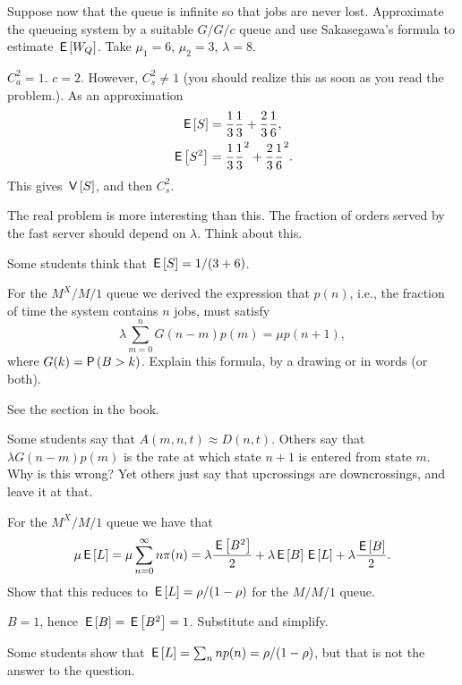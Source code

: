\begin{exercise}[201904, 2]
  Suppose now that the queue is infinite so that jobs are never lost.
  Approximate the queueing system by a suitable $G/G/c$ queue and use Sakasegawa's formula to estimate $\,\mathsf{E}\left[W_Q\right]$.
  Take $\mu_1=6$, $\mu_2=3$, $\lambda=8$.
\begin{solution}
  $C_a^2=1$. $c=2$. However, $C_s^2\neq 1$ (you should realize this as soon as you read the problem.). As an approximation
  \begin{align*}
  \,\mathsf{E}\left[S\right] &= \frac 1 3 \frac 1 3 + \frac 2 3 \frac 1 6, \\
  \,\mathsf{E}\left[S^2\right] &= \frac 1 3 \frac 1 3^2 + \frac 2 3 \frac 1 6^2.
  \end{align*}
  This gives $\,\mathsf{V}\left[S\right]$, and then $C_s^2$.

  The real problem is more interesting than this.
  The fraction of orders served by the fast server should depend on $\lambda$.
  Think about this.

  Some students think that $\,\mathsf{E}\left[S\right] = 1/(3+6)$. 
\end{solution}
\end{exercise}



\begin{exercise}[201904, 1]
  For the $M^X/M/1$ queue  we derived the expression that $p(n)$, i.e., the fraction of time the system contains $n$ jobs, must satisfy
  \begin{equation}
  \lambda \sum_{m=0}^n G(n-m) p(m) = \mu p(n+1),  
  \end{equation}
  where $G(k) = \P{B>k}$.
  Explain this formula, by a drawing or in words (or both).
\begin{solution}
    See the section in the book.

    Some students say that $A(m,n,t) \approx D(n,t)$. Others say that $\lambda G(n-m)p(m)$ is the rate at which state $n+1$ is entered from state $m$. Why is this wrong?  Yet others just say that upcrossings are downcrossings, and leave it at that. 
\end{solution}

\end{exercise}



\begin{exercise}[201904, 1]
For the $M^X/M/1$ queue we have that
\begin{equation}
  \mu \,\mathsf{E}\left[L\right] =\mu \sum_{n=0}^\infty n \pi(n) = \lambda \frac{\,\mathsf{E}\left[B^2\right]}2  + \lambda \,\mathsf{E}\left[B\right] \,\mathsf{E}\left[L\right] +\lambda \frac{\,\mathsf{E}\left[B\right]}2.
\end{equation}
Show that this reduces to $\,\mathsf{E}\left[L\right] = \rho/(1-\rho)$ for the $M/M/1$ queue.
\begin{solution}
  $B=1$, hence  $\,\mathsf{E}\left[B\right] = \,\mathsf{E}\left[B^2\right] = 1$. Substitute and simplify.

  Some students show that $\,\mathsf{E}\left[L\right] = \sum_n np(n)=\rho/(1-\rho)$, but that is not the answer to the question.
\end{solution}
\end{exercise}

